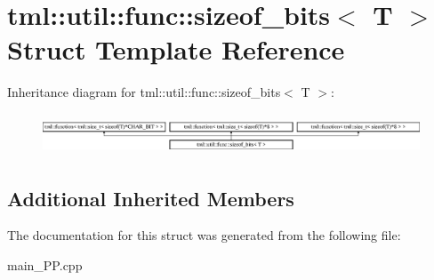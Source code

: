 \hypertarget{structtml_1_1util_1_1func_1_1sizeof__bits}{\section{tml\+:\+:util\+:\+:func\+:\+:sizeof\+\_\+bits$<$ T $>$ Struct Template Reference}
\label{structtml_1_1util_1_1func_1_1sizeof__bits}
}
Inheritance diagram for tml\+:\+:util\+:\+:func\+:\+:sizeof\+\_\+bits$<$ T $>$\+:\begin{figure}[H]
\begin{center}
\leavevmode
\includegraphics[height=1.236203cm]{structtml_1_1util_1_1func_1_1sizeof__bits}
\end{center}
\end{figure}
\subsection*{Additional Inherited Members}


The documentation for this struct was generated from the following file\+:\begin{DoxyCompactItemize}
\item 
main\+\_\+\+P\+P.\+cpp\end{DoxyCompactItemize}
